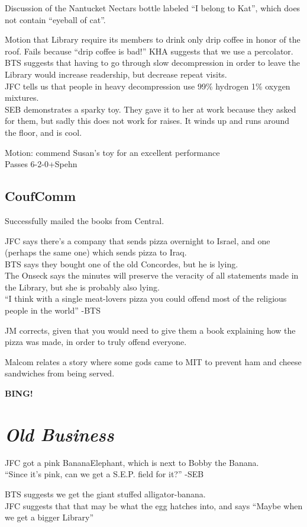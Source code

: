 \documentclass[10pt]{article}
\newcommand{\bing}{{\bf BING!} }
\newcommand{\goto}[1]{\bing \vskip 12pt \section*{{\em{#1}}}}
\begin{document}
Discussion of the Nantucket Nectars bottle labeled ``I belong to
Kat'', which does not contain ``eyeball of cat''.

Motion that Library require its members to drink only drip coffee in
honor of the roof. Fails because ``drip coffee is bad!''
KHA suggests that we use a percolator.\\
BTS suggests that having to go through slow decompression in order to
leave the Library would increase readership, but decrease repeat
visits.\\
JFC tells us that people in heavy decompression use 99\% hydrogen 1\%
oxygen mixtures.\\
SEB demonstrates a sparky toy. They gave it to her at work because
they asked for them, but sadly this does not work for raises.
It winds up and runs around the floor, and is cool.

Motion: commend Susan's toy for an excellent performance\\
Passes 6-2-0+Spehn

\subsection*{CoufComm}
Successfully mailed the books from Central.

JFC says there's a company that sends pizza overnight to Israel, and
one (perhaps the same one) which sends pizza to Iraq.\\
BTS says they bought one of the old Concordes, but he is lying.\\
The Onseck says the minutes will preserve the veracity of all
statements made in the Library, but she is probably also lying.\\

``I think with a single meat-lovers pizza you could offend most of the
religious people in the world'' -BTS

JM corrects, given that you would need to give them a book explaining
how the pizza was made, in order to truly offend everyone.

Malcom relates a story where some gods came to MIT to prevent ham and
cheese sandwiches from being served.


\goto{Old Business}

JFC got a pink BananaElephant, which is next to Bobby the Banana.\\
``Since it's pink, can we get a S.E.P. field for it?'' -SEB

BTS suggests we get the giant stuffed alligator-banana.\\
JFC suggests that that may be what the egg hatches into, and says
``Maybe when we get a bigger Library''
\end{document}
